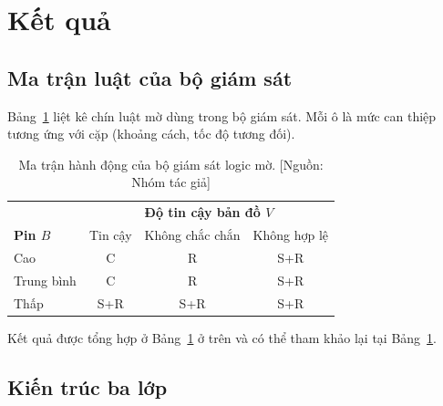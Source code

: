 
\section{Kết quả}

\subsection{Ma trận luật của bộ giám sát}

Bảng~\ref{tab:rules} liệt kê chín luật mờ dùng trong bộ giám sát. Mỗi ô là
mức can thiệp tương ứng với cặp (khoảng cách, tốc độ tương đối).

\begin{table}[!htbp]
  \caption{Ma trận hành động của bộ giám sát logic mờ.
           [Nguồn: Nhóm tác giả]}
  \label{tab:rules}
  \raggedright
  {\fontsize{7}{9.3}\selectfont
  \begin{tabular}{@{}lccc@{}}
    \toprule
    & \multicolumn{3}{c}{\textbf{Độ tin cậy bản đồ $V$}} \\
    \textbf{Pin $B$} & Tin cậy & Không chắc chắn & Không hợp lệ \\
    \midrule
    Cao        & C   & R   & S+R \\
    Trung bình & C   & R   & S+R \\
    Thấp       & S+R & S+R & S+R \\
    \bottomrule
  \end{tabular}}
\end{table}
Kết quả được tổng hợp ở Bảng~\ref{tab:rules} ở trên và có thể tham khảo lại tại Bảng~\ref{tab:rules}.

\subsection{Kiến trúc ba lớp}

